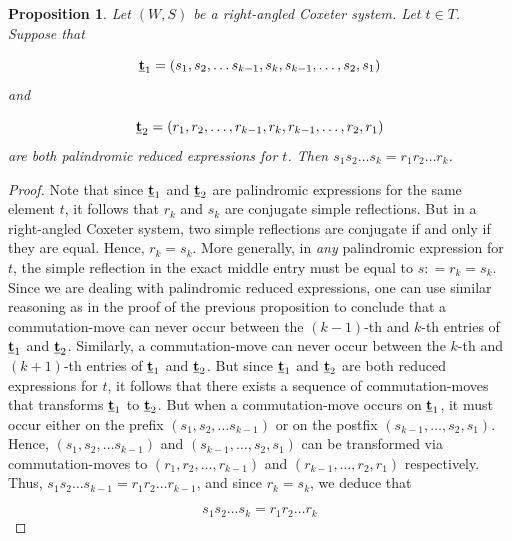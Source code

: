 \documentclass{amsart}
\theoremstyle{plain} %
\newtheorem{prop}[thm]{Proposition}
\theoremstyle{definition}
\begin{document}
\begin{prop} \label{reflwordequal}
    Let $ (W,S)$ be a right-angled Coxeter system. Let $ t\in T $. Suppose that 

    $$ \textbf{\underline{t}}_{1} = (s_{1}, s_{2} , \dots s_{k-1}, s_{k}, s_{k-1} , \dots , s_{2}, s_{1}) $$
    and

    $$ \textbf{\underline{t}}_{2} = (r_{1}, r_{2} ,\dots , r_{k-1}, r_{k}, r_{k-1}, \dots , r_{2}, r_{1})$$
    are both palindromic reduced expressions for $ t$. Then $ s_{1}s_{2} \dots s_{k} = r_{1}r_{2} \dots r_{k}$.
\end{prop}

\begin{proof}
    Note that since $ \textbf{\underline{t}}_{1}$ and $ \textbf{\underline{t}}_{2}$ are palindromic expressions for the same element $t$, it follows that $ r_{k}$ and $ s_{k}$ are conjugate simple reflections. But in a right-angled Coxeter system, two simple reflections are conjugate if and only if they are equal. Hence, $ r_{k} = s_{k}$. More generally, in \emph{any} palindromic expression for $t$, the simple reflection in the exact middle entry must be equal to $ s: = r_{k} = s_{k}$. Since we are dealing with palindromic reduced expressions, one can use similar reasoning as in the proof of the previous proposition to conclude that a commutation-move can never occur between the $ (k-1)$-th and $ k$-th entries of $ \textbf{\underline{t}}_{1}$ and $ \textbf{\underline{t}}_{2}$. Similarly, a commutation-move can never occur between the $ k$-th and $(k+1)$-th entries of $ \textbf{\underline{t}}_{1}$ and $ \textbf{\underline{t}}_{2}$. But since $ \textbf{\underline{t}}_{1}$ and $ \textbf{\underline{t}}_{2}$ are both reduced expressions for $t$, it follows that there exists a sequence of commutation-moves that transforms $ \textbf{\underline{t}}_{1}$ to $ \textbf{\underline{t}}_{2}$. But when a commutation-move occurs on $ \textbf{\underline{t}}_{1}$, it must occur either on the prefix $ (s_{1}, s_{2} , \dots s_{k-1})$ or on the postfix $(s_{k-1} , \dots , s_{2}, s_{1}) $. Hence, $ (s_{1}, s_{2} , \dots s_{k-1})$ and $(s_{k-1} , \dots , s_{2}, s_{1}) $ can be transformed via commutation-moves to $(r_{1}, r_{2} ,\dots , r_{k-1}) $ and $(r_{k-1}, \dots , r_{2}, r_{1}) $ respectively. Thus, $ s_{1}s_{2} \dots s_{k-1} = r_{1}r_{2} \dots r_{k-1}$, and since $ r_{k} = s_{k}$, we deduce that

    $$ s_{1}s_{2} \dots s_{k} = r_{1}r_{2} \dots r_{k}$$
\end{proof}
\end{document}
